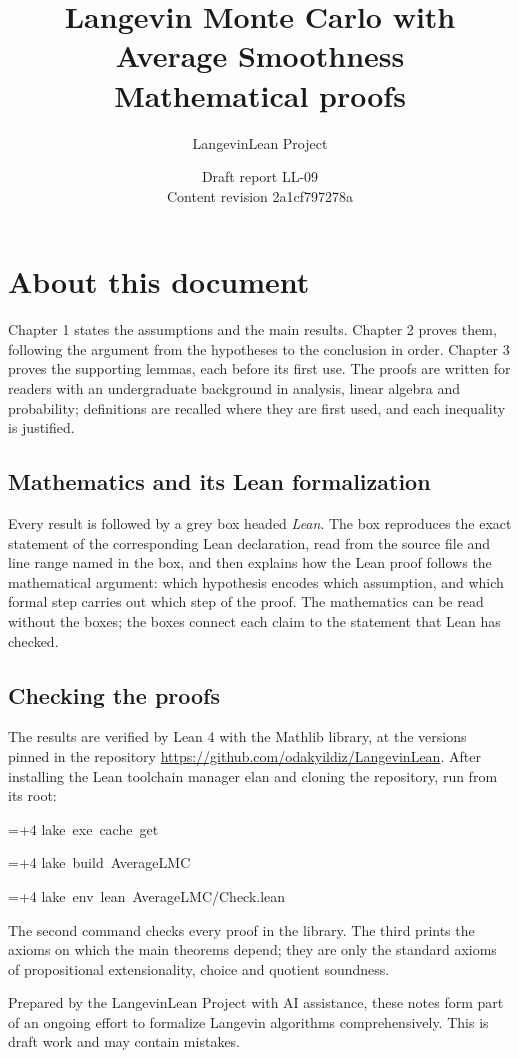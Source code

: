 \documentclass[11pt,a4paper]{report}
\title{\texorpdfstring{Langevin Monte Carlo with Average Smoothness}{Langevin Monte Carlo with Average Smoothness}\\[0.6em]\large Mathematical proofs}
\author{LangevinLean Project}
\date{Draft report LL-09\\[0.4em]\small Content revision 2a1cf797278a}
\newlength{\leancharwidth}
\newenvironment{leancode}{\par\smallskip\begingroup\ttfamily\footnotesize\raggedright
  \settowidth{\leancharwidth}{M}\setlength{\parskip}{0pt}\setlength{\parindent}{0pt}
  \frenchspacing}{\par\endgroup\smallskip}
\newcommand{\leanline}[2]{\hangindent=\dimexpr#1\leancharwidth+4\leancharwidth\relax
  \hangafter=1\noindent\hspace*{#1\leancharwidth}#2\par}
\begin{document}
\maketitle
\chapter*{About this document}
Chapter 1 states the assumptions and the main results. Chapter 2 proves them, following the argument from the hypotheses to the conclusion in order. Chapter 3 proves the supporting lemmas, each before its first use. The proofs are written for readers with an undergraduate background in analysis, linear algebra and probability; definitions are recalled where they are first used, and each inequality is justified.

\section*{Mathematics and its Lean formalization}
Every result is followed by a grey box headed \emph{Lean}. The box reproduces the exact statement of the corresponding Lean declaration, read from the source file and line range named in the box, and then explains how the Lean proof follows the mathematical argument: which hypothesis encodes which assumption, and which formal step carries out which step of the proof. The mathematics can be read without the boxes; the boxes connect each claim to the statement that Lean has checked.

\section*{Checking the proofs}
The results are verified by Lean 4 with the Mathlib library, at the versions pinned in the repository \url{https://github.com/odakyildiz/LangevinLean}. After installing the Lean toolchain manager elan and cloning the repository, run from its root:
\begin{leancode}
\leanline{0}{lake\ exe\ cache\ get}
\leanline{0}{lake\ build\ AverageLMC}
\leanline{0}{lake\ env\ lean\ AverageLMC/Check.lean}
\end{leancode}
The second command checks every proof in the library. The third prints the axioms on which the main theorems depend; they are only the standard axioms of propositional extensionality, choice and quotient soundness.

Prepared by the LangevinLean Project with AI assistance, these notes form part of an ongoing effort to formalize Langevin algorithms comprehensively. This is draft work and may contain mistakes.
\end{document}
